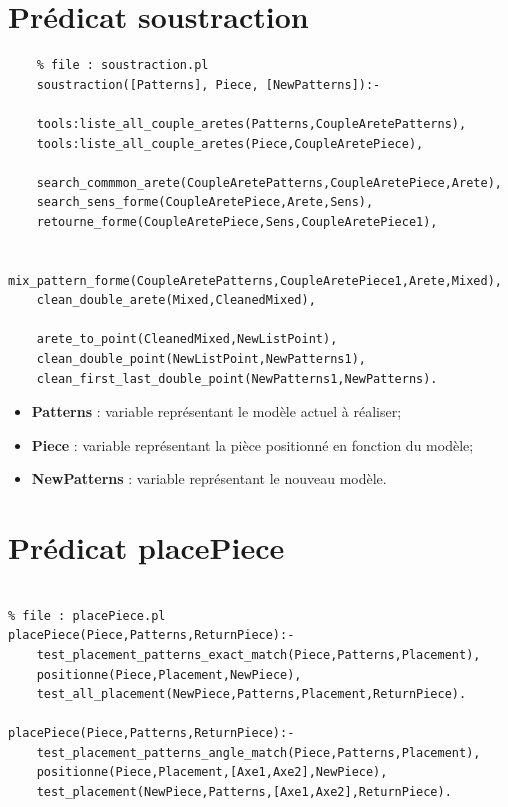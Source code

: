\documentclass[a4paper, 11pt]{report}
\begin{document}
	\begin{appendices}

    \chapter{Prédicat soustraction}
    \begin{verbatim}
    % file : soustraction.pl
    soustraction([Patterns], Piece, [NewPatterns]):-

    tools:liste_all_couple_aretes(Patterns,CoupleAretePatterns),
    tools:liste_all_couple_aretes(Piece,CoupleAretePiece),

    search_commmon_arete(CoupleAretePatterns,CoupleAretePiece,Arete),
    search_sens_forme(CoupleAretePiece,Arete,Sens),
    retourne_forme(CoupleAretePiece,Sens,CoupleAretePiece1),

    mix_pattern_forme(CoupleAretePatterns,CoupleAretePiece1,Arete,Mixed),
    clean_double_arete(Mixed,CleanedMixed),

    arete_to_point(CleanedMixed,NewListPoint),
    clean_double_point(NewListPoint,NewPatterns1),
    clean_first_last_double_point(NewPatterns1,NewPatterns).
    \end{verbatim}

    \begin{itemize}
        \item \textbf{Patterns} : variable représentant le modèle actuel à réaliser;
        \item \textbf{Piece} : variable représentant la pièce positionné en fonction du modèle;
        \item \textbf{NewPatterns} : variable représentant le nouveau modèle.
    \end{itemize}

\chapter{Prédicat placePiece}
    \begin{verbatim}

% file : placePiece.pl
placePiece(Piece,Patterns,ReturnPiece):-
    test_placement_patterns_exact_match(Piece,Patterns,Placement),
    positionne(Piece,Placement,NewPiece),
    test_all_placement(NewPiece,Patterns,Placement,ReturnPiece).

placePiece(Piece,Patterns,ReturnPiece):-
    test_placement_patterns_angle_match(Piece,Patterns,Placement),
    positionne(Piece,Placement,[Axe1,Axe2],NewPiece),
    test_placement(NewPiece,Patterns,[Axe1,Axe2],ReturnPiece).


\end{verbatim}
\end{appendices}
\end{document}
